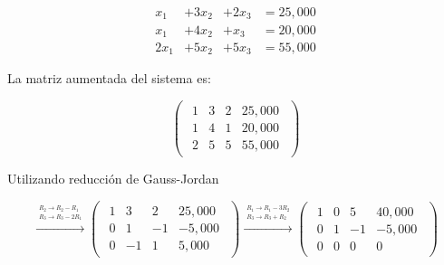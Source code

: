 \documentclass{article}
\begin{document}
\begin{equation*}
    \begin{aligned}
        x_1 &+ 3x_2 &+ 2x_3 &= 25,000\\
        x_1 &+ 4x_2 &+ x_3 &= 20,000\\
        2x_1 &+ 5x_2 &+ 5x_3 &= 55,000
    \end{aligned}
\end{equation*}

La matriz aumentada del sistema es:

\begin{equation*}
    \begin{pmatrix}
        \begin{array}{rrr|r}
            1 & 3 & 2 & 25,000\\
            1 & 4 & 1 & 20,000 \\
            2 & 5 & 5 & 55,000
        \end{array}
    \end{pmatrix}
\end{equation*}

Utilizando reducción de Gauss-Jordan

\begin{equation*}
    \xrightarrow{\overset{\begin{aligned} R_2 \rightarrow R_2 - R_1 \\ R_3 \rightarrow R_3 - 2R_1\end{aligned}}{}} 
    \begin{pmatrix}
        \begin{array}{rrr|r}
            1& 3 & 2 & 25,000\\
            0 & 1 &-1 &-5,000 \\
            0 & -1 & 1 & 5,000
        \end{array}
    \end{pmatrix}
    \xrightarrow{\overset{\begin{aligned} R_1 \rightarrow R_1 - 3R_2 \\ R_3 \rightarrow R_3 + R_2\end{aligned}}{}} 
    \begin{pmatrix}
        \begin{array}{rrr|r}
            1 & 0 & 5 & 40,000\\
            0 & 1 & -1 & -5,000\\
            0 & 0 & 0 & 0
        \end{array}
    \end{pmatrix}
\end{equation*}
\end{document}
